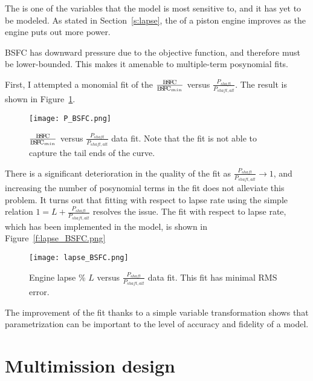 The \BSFC is one of the variables that the model is most sensitive to, and it has yet to be modeled. As
stated in Section~\ref{s:lapse}, the \BSFC of a piston engine improves as the engine puts out more power.

BSFC has downward pressure due to the objective function, and therefore must be lower-bounded. This makes
it amenable to multiple-term posynomial fits.

First, I attempted a monomial fit of the $\frac{{\rm B\!S\!F\!C}}{{\rm B\!S\!F\!C}_{min}}$ versus $\frac{P_{shaft}}{P_{shaft,alt}}$.
The result is shown in Figure~\ref{f:P_BSFC}.

\begin{center}
    \begin{figure}
        \texttt{[image: P\_BSFC.png]}
        \caption{$\frac{{\rm B\!S\!F\!C}}{{\rm B\!S\!F\!C}_{min}}$ versus $\frac{P_{shaft}}{P_{shaft,alt}}$ data fit. Note that the fit is
        not able to capture the tail ends of the curve.}
        \label{f:P_BSFC}
    \end{figure}
\end{center}

There is a significant deterioration in the quality of the fit as $\frac{P_{shaft}}{P_{shaft,alt}} \xrightarrow[]{} 1$,
and increasing the number of posynomial terms in the fit does not alleviate this problem. It
turns out that fitting with respect to lapse rate using the simple relation $1 = L + \frac{P_{shaft}}{P_{shaft,alt}}$
resolves the issue. The fit with respect to lapse rate, which has been implemented in the model, is
shown in Figure~\ref{f:lapse_BSFC.png}

\begin{center}
    \begin{figure}
        \texttt{[image: lapse\_BSFC.png]}
        \caption{Engine lapse \% $L$ versus $\frac{P_{shaft}}{P_{shaft,alt}}$ data fit. This fit has minimal
        RMS error.}
        \label{f:lapse_BSFC}
    \end{figure}
\end{center}

The improvement of the fit thanks to a simple variable transformation shows that
parametrization can be important to the level of accuracy and fidelity of a model.

\section{Multimission design}
\label{s:multimission}

